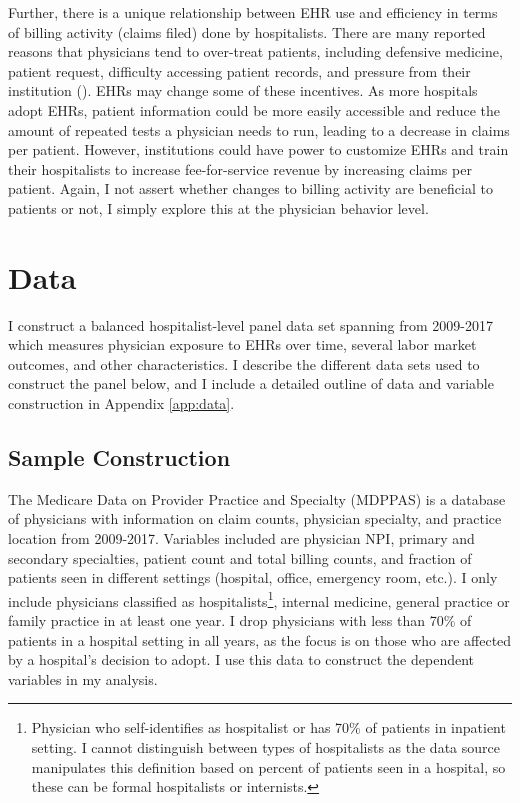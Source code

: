 \documentclass[12pt]{article}
\begin{document}
Further, there is a unique relationship between EHR use and efficiency in terms of billing activity (claims filed) done by hospitalists. There are many reported reasons that physicians tend to over-treat patients, including defensive medicine, patient request, difficulty accessing patient records, and pressure from their institution (\cite{lyu2017overtreatment}). EHRs may change some of these incentives. As more hospitals adopt EHRs, patient information could be more easily accessible and reduce the amount of repeated tests a physician needs to run, leading to a decrease in claims per patient. However, institutions could have power to customize EHRs and train their hospitalists to increase fee-for-service revenue by increasing claims per patient. Again, I not assert whether changes to billing activity are beneficial to patients or not, I simply explore this at the physician behavior level. 





\section{Data}\label{sec:data}

I construct a balanced hospitalist-level panel data set spanning from 2009-2017 which measures physician exposure to EHRs over time, several labor market outcomes, and other characteristics. I describe the different data sets used to construct the panel below, and I include a detailed outline of data and variable construction in Appendix \ref{app:data}.

\subsection{Sample Construction}

The Medicare Data on Provider Practice and Specialty (MDPPAS) is a database of physicians with information on claim counts, physician specialty, and practice location from 2009-2017. Variables included are physician NPI, primary and secondary specialties, patient count and total billing counts, and fraction of patients seen in different settings (hospital, office, emergency room, etc.). I only include physicians classified as hospitalists\footnote{Physician who self-identifies as hospitalist or has 70\% of patients in inpatient setting. I cannot distinguish between types of hospitalists as the data source manipulates this definition based on percent of patients seen in a hospital, so these can be formal hospitalists or internists.}, internal medicine, general practice or family practice in at least one year. I drop physicians with less than 70\% of patients in a hospital setting in all years, as the focus is on those who are affected by a hospital's decision to adopt. I use this data to construct the dependent variables in my analysis.  
\end{document}
